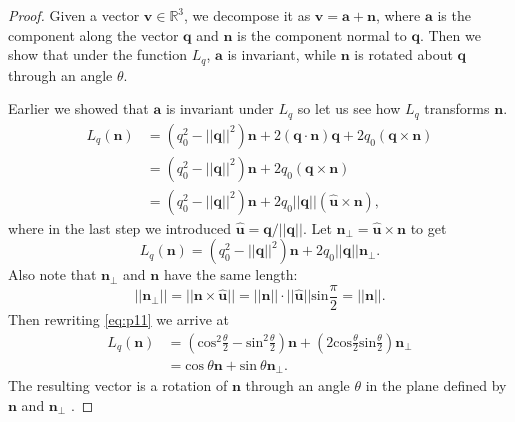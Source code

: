 \begin{proof}
Given a vector $\textbf{v} \in \mathbb{R}^3$, we decompose it as $\textbf{v} = \textbf{a} + \textbf{n}$, where $\textbf{a}$ is the component along the vector $\textbf{q}$ and $\textbf{n}$ is the component normal to $\textbf{q}$. 
Then we show that under the function $L_q$, $\textbf{a}$ is invariant, while $\textbf{n}$ is rotated about $\textbf{q}$ through an angle $\theta$. 

Earlier we showed that $\textbf{a}$ is invariant under $L_q$ so let us see how $L_q$ transforms $\textbf{n}$.
\begin{align*}
L_q(\textbf{n}) &= (q_0^2 - ||\textbf{q}||^2)\textbf{n} + 2(\textbf{q} \cdot \textbf{n})\textbf{q} + 2q_0(\textbf{q} \times \textbf{n}) \\
&= (q_0^2 - ||\textbf{q}||^2)\textbf{n} + 2q_0(\textbf{q} \times \textbf{n}) \\
&= (q_0^2 - ||\textbf{q}||^2)\textbf{n} + 2q_0||\textbf{q}||(\mathbf{\hat{u}} \times \textbf{n}),
\end{align*}
where in the last step we introduced $\mathbf{\hat{u}} = \textbf{q}/||\textbf{q}||$.
Let $\textbf{n}_{\bot} = \mathbf{\hat{u}} \times \textbf{n}$ to get
\begin{equation}
L_q(\textbf{n}) = (q_0^2 -||\textbf{q}||^2)\textbf{n} + 2q_0||\textbf{q}||\textbf{n}_{\bot}.
\label{eq:p11}
\end{equation}
Also note that $\textbf{n}_{\bot}$ and $\textbf{n}$ have the same length:
\begin{equation*}
||\textbf{n}_{\bot}|| = ||\textbf{n} \times \mathbf{\hat{u}}|| = ||\textbf{n}|| \cdot ||\mathbf{\hat{u}}||\mbox{sin}\frac{\pi}{2} = ||\textbf{n}||.
\end{equation*}
Then rewriting \eqref{eq:p11} we arrive at
\begin{align*}
L_q(\textbf{n}) &= \left( \mbox{cos}^2 \frac{\theta}{2} - \mbox{sin}^2 \frac{\theta}{2} \right) \textbf{n} + \left( 2\mbox{cos} \frac{\theta}{2} \mbox{sin} \frac{\theta}{2} \right) \textbf{n}_{\bot} \\
&= \mbox{cos}~\theta \textbf{n} + \mbox{sin}~\theta \textbf{n}_{\bot}.
\end{align*}
The resulting vector is a rotation of $\textbf{n}$ through an angle $\theta$ in the plane defined by $\textbf{n}$ and $\textbf{n}_{\bot}$ \cite{jia2008quaternions}.
\end{proof}


